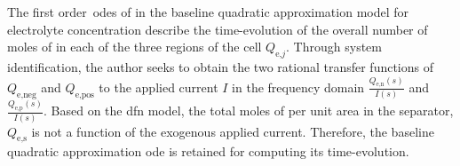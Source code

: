
The                  first                 order~\glspl{ode}                  of
 in the baseline
quadratic  approximation  model  for   electrolyte  concentration  describe  the
time-evolution of the overall number of moles  of  in each of the three
regions of the cell $Q_{\text{e,}j}$.  Through system identification, the author
seeks  to obtain  the two  rational transfer  functions of  $Q_\text{e,neg}$ and
$Q_\text{e,pos}$  to the  applied current  $I$  in the  frequency domain \ie{}
$\frac{Q_\text{e,n}(s)}{I(s)}$ and $\frac{Q_\text{e,p}(s)}{I(s)}$.  Based on the
\gls{dfn} model,  the total moles of   per unit area  in the separator,
$Q_\text{e,s}$ is  not a function  of the exogenous applied  current. Therefore,
the baseline  quadratic approximation  \gls{ode} is  retained for  computing its
time-evolution.

